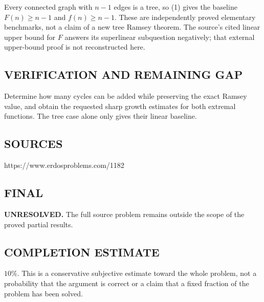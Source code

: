 Every connected graph with $n-1$ edges is a tree, so (1) gives the baseline
$F(n)\ge n-1$ and $f(n)\ge n-1$. These are independently proved elementary
benchmarks, not a claim of a new tree Ramsey theorem. The source's cited
linear upper bound for $F$ answers its superlinear subquestion negatively;
that external upper-bound proof is not reconstructed here.

\subsection*{VERIFICATION AND REMAINING GAP}
Determine how many cycles can be added while preserving the exact Ramsey
value, and obtain the requested sharp growth estimates for both extremal
functions. The tree case alone only gives their linear baseline.

\subsection*{SOURCES}
https://www.erdosproblems.com/1182

\subsection*{FINAL}
\textbf{UNRESOLVED.} The full source problem remains outside the scope of the proved partial results.

\subsection*{COMPLETION ESTIMATE}
$10\%$. This is a conservative subjective estimate toward the whole problem, not a probability that the argument is correct or a claim that a fixed fraction of the problem has been solved.
